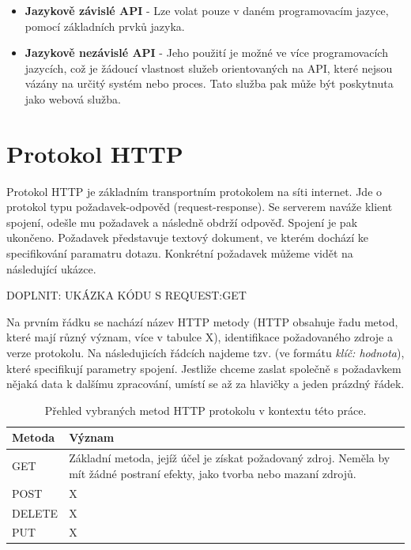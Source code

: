 \begin{itemize}
  \item \textbf{Jazykově závislé API} - Lze volat pouze v daném programovacím jazyce, pomocí základních prvků jazyka.
  \item \textbf{Jazykově nezávislé API} - Jeho použití je možné ve více programovacích jazycích, což je žádoucí vlastnost
    služeb orientovaných na API, které nejsou vázány na určitý systém nebo proces.
    Tato služba pak může být poskytnuta jako webová služba.
\end{itemize}

\section{Protokol HTTP}

\indent


Protokol HTTP je základním transportním protokolem na síti internet.
Jde o protokol typu požadavek-odpověd (request-response). Se serverem naváže klient spojení,
odešle mu požadavek a následně obdrží odpověď. Spojení je pak ukončeno.
Požadavek představuje textový dokument, ve kterém dochází ke specifikování paramatru dotazu.
Konkrétní požadavek můžeme vidět na následující ukázce.

\medskip

DOPLNIT: UKÁZKA KÓDU S REQUEST:GET

\medskip

Na prvním řádku se nachází název HTTP metody (HTTP obsahuje řadu metod, které mají různý význam, více v tabulce X),
identifikace požadovaného zdroje a verze protokolu. Na následujicích řádcích najdeme tzv. 
(ve formátu \textit{klíč: hodnota}), které specifikují parametry spojení. Jestliže chceme zaslat společně s požadavkem
nějaká data k dalšímu zpracování, umístí se až za hlavičky a jeden prázdný řádek.


\begin{table}[htb]
\centering
\begin{tabular}{|l|l|}\hline
\bfseries \bfseries Metoda & \bfseries Význam \\[2mm]
\hline
GET & Základní metoda, jejíž účel je získat požadovaný zdroj. Neměla by mít žádné postraní efekty, jako tvorba nebo mazaní zdrojů.\\
\hline
POST & X \\
\hline
DELETE & X \\
\hline
PUT & X\\
\hline
\end{tabular}
\caption{Přehled vybraných metod HTTP protokolu v kontextu této práce.} 
\end{table}

